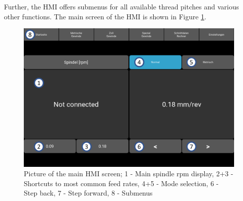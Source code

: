 Further, the HMI offers submenus for all available thread pitches and various other functions. The main screen of the HMI is shown in Figure \ref{HMI main Screen}.
 
\begin{figure}
    \begin{center}
    \includegraphics[width=12cm]{Pictures/HMI.png}
    \caption[Picture of the main HMI screen]{Picture of the main HMI screen; 1 - Main spindle rpm display, 2+3 - Shortcuts to most common feed rates, 4+5 - Mode selection, 6 - Step back, 7 - Step forward, 8 - Submenus}
    \label{HMI main Screen}
    \end{center}
\end{figure}
 
